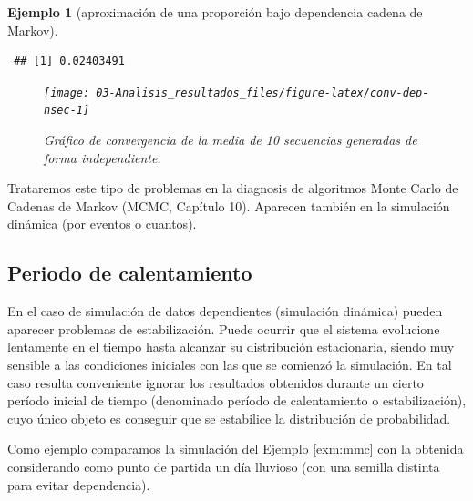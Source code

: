 \documentclass[
]{book}
\theoremstyle{break}
\newtheorem{example}{Ejemplo}[chapter]
\theoremstyle{nonumberplain}
\begin{document}
\begin{example}[aproximación de una proporción bajo dependencia cadena de Markov]
\begin{verbatim}
 ## [1] 0.02403491
\end{verbatim}

\begin{figure}[!htb]

{\centering \texttt{[image: 03-Analisis\_resultados\_files/figure-latex/conv-dep-nsec-1]} 

}

\caption{Gráfico de convergencia de la media de 10 secuencias generadas de forma independiente.}\label{fig:conv-dep-nsec}
\end{figure}

\end{example}

Trataremos este tipo de problemas en la diagnosis de algoritmos Monte Carlo de Cadenas de Markov (MCMC, Capítulo 10).
Aparecen también en la simulación dinámica (por eventos o cuantos).

\hypertarget{periodo-de-calentamiento}{%
\subsection{Periodo de calentamiento}\label{periodo-de-calentamiento}}

En el caso de simulación de datos dependientes (simulación dinámica)
pueden aparecer problemas de estabilización. Puede ocurrir que el sistema
evolucione lentamente en el tiempo hasta alcanzar su distribución estacionaria,
siendo muy sensible a las condiciones iniciales con las que se comienzó la
simulación. En tal caso resulta conveniente ignorar los resultados obtenidos
durante un cierto período inicial de tiempo (denominado período de calentamiento
o estabilización), cuyo único objeto es conseguir que se estabilice la distribución de
probabilidad.

Como ejemplo comparamos la simulación del Ejemplo \ref{exm:mmc} con la obtenida considerando como punto de partida un día lluvioso (con una semilla distinta para evitar dependencia).
\end{document}
